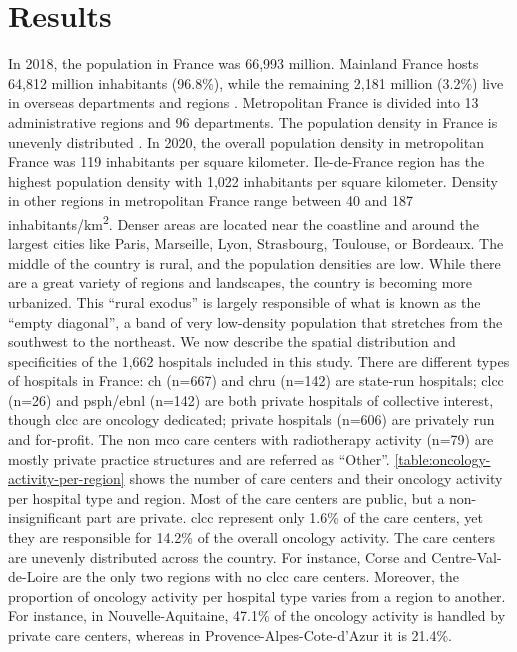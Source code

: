\section{Results}

In 2018, the population in France was 66,993 million. Mainland France hosts
64,812 million inhabitants (96.8\%), while the remaining 2,181 million (3.2\%)
live in overseas departments and regions . Metropolitan France is divided into
13 administrative regions and 96 departments. The population density in France
is unevenly distributed . In 2020, the overall population density in
metropolitan France was 119 inhabitants per square kilometer. Ile-de-France
region has the highest population density with 1,022 inhabitants per square
kilometer. Density in other regions in metropolitan France range between 40 and
187 inhabitants/km\textsuperscript{2}. Denser areas are located near the
coastline and around the largest cities like Paris, Marseille, Lyon, Strasbourg,
Toulouse, or Bordeaux. The middle of the country is rural, and the population
densities are low. While there are a great variety of regions and landscapes,
the country is becoming more urbanized. This ``rural exodus'' is largely
responsible of what is known as the ``empty diagonal'', a band of very
low-density population that stretches from the southwest to the northeast. We
now describe the spatial distribution and specificities of the 1,662 hospitals
included in this study. There are different types of hospitals in France:
\ac{ch}  (n=667) and \ac{chru}  (n=142) are state-run hospitals; \ac{clcc}
(n=26) and \ac{psph}/\ac{ebnl}  (n=142) are both private hospitals of collective
interest, though \ac{clcc} are oncology dedicated; private hospitals (n=606) are
privately run and for-profit. The non \ac{mco} care centers with radiotherapy
activity (n=79) are mostly private practice structures and are referred as
“Other”. \cref{table:oncology-activity-per-region} shows the number of care
centers and their oncology activity per hospital type and region. Most of the
care centers are public, but a non-insignificant part are private. \ac{clcc}
represent only 1.6\% of the care centers, yet they are responsible for 14.2\% of
the overall oncology activity. The care centers are unevenly distributed across
the country. For instance, Corse and Centre-Val-de-Loire are the only two
regions with no \ac{clcc} care centers. Moreover, the proportion of oncology
activity per hospital type varies from a region to another. For instance, in
Nouvelle-Aquitaine, 47.1\% of the oncology activity is handled by private care
centers, whereas in Provence-Alpes-Cote-d'Azur it is 21.4\%.

